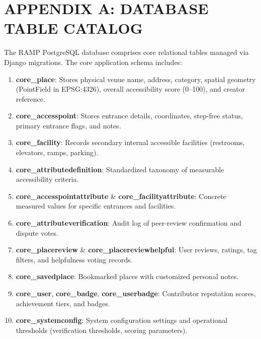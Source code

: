 \documentclass[12pt,a4paper]{report}
\begin{document}
\section*{APPENDIX A: DATABASE TABLE CATALOG}
The RAMP PostgreSQL database comprises core relational tables managed via Django migrations. The core application schema includes:

\begin{enumerate}
    \item \textbf{core\_place}: Stores physical venue name, address, category, spatial geometry (PointField in EPSG:4326), overall accessibility score (0--100), and creator reference.
    \item \textbf{core\_accesspoint}: Stores entrance details, coordinates, step-free status, primary entrance flags, and notes.
    \item \textbf{core\_facility}: Records secondary internal accessible facilities (restrooms, elevators, ramps, parking).
    \item \textbf{core\_attributedefinition}: Standardized taxonomy of measurable accessibility criteria.
    \item \textbf{core\_accesspointattribute} \& \textbf{core\_facilityattribute}: Concrete measured values for specific entrances and facilities.
    \item \textbf{core\_attributeverification}: Audit log of peer-review confirmation and dispute votes.
    \item \textbf{core\_placereview} \& \textbf{core\_placereviewhelpful}: User reviews, ratings, tag filters, and helpfulness voting records.
    \item \textbf{core\_savedplace}: Bookmarked places with customized personal notes.
    \item \textbf{core\_user}, \textbf{core\_badge}, \textbf{core\_userbadge}: Contributor reputation scores, achievement tiers, and badges.
    \item \textbf{core\_systemconfig}: System configuration settings and operational thresholds (verification thresholds, scoring parameters).
\end{enumerate}
\end{document}
